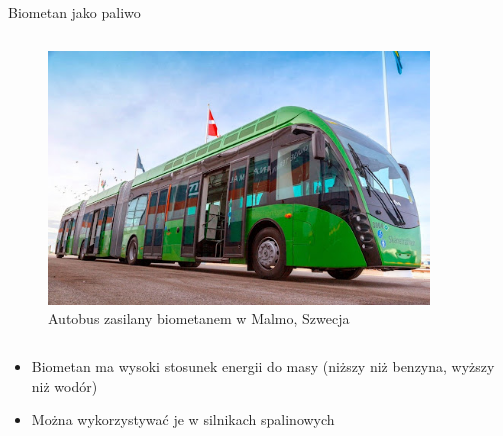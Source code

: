 \begin{columnframe}{Biometan jako paliwo}
    \begin{column}{0.5\textwidth}
        \begin{figure}
            \centering
            \includegraphics[width=0.9\textwidth, frame]{images/Biomethane_bus_malmo.jpg}
            \caption{Autobus zasilany biometanem w Malmo, Szwecja}
        \end{figure}
    \end{column}
    \begin{column}{0.5\textwidth}
        \begin{itemize}
            \item Biometan ma wysoki stosunek energii do masy (niższy niż benzyna, wyższy niż wodór)
            \item Można wykorzystywać je w silnikach spalinowych
        \end{itemize}
    \end{column}
\end{columnframe}

